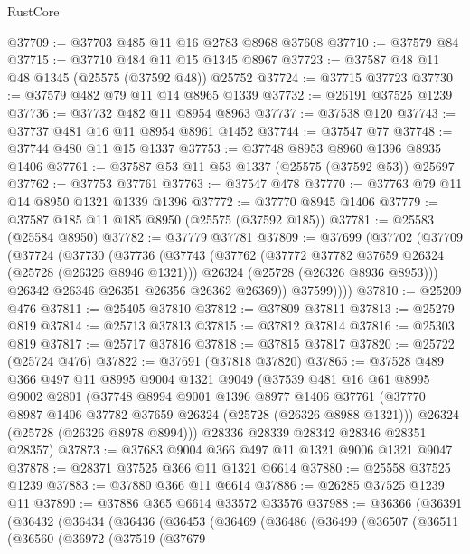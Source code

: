 \begin{lexlean}{RustCore}
\begin{coremodule}
@37709 := @37703 @485 @11 @16 @2783 @8968 @37608
@37710 := @37579 @84
@37715 := @37710 @484 @11 @15 @1345 @8967
@37723 := @37587 @48 @11 @48 @1345 (@25575 (@37592 @48)) @25752
@37724 := @37715 @37723
@37730 := @37579 @482 @79 @11 @14 @8965 @1339
@37732 := @26191 @37525 @1239
@37736 := @37732 @482 @11 @8954 @8963
@37737 := @37538 @120
@37743 := @37737 @481 @16 @11 @8954 @8961 @1452
@37744 := @37547 @77
@37748 := @37744 @480 @11 @15 @1337
@37753 := @37748 @8953 @8960 @1396 @8935 @1406
@37761 := @37587 @53 @11 @53 @1337 (@25575 (@37592 @53)) @25697
@37762 := @37753 @37761
@37763 := @37547 @478
@37770 := @37763 @79 @11 @14 @8950 @1321 @1339 @1396
@37772 := @37770 @8945 @1406
@37779 := @37587 @185 @11 @185 @8950 (@25575 (@37592 @185))
@37781 := @25583 (@25584 @8950)
@37782 := @37779 @37781
@37809 := @37699
    (@37702
      (@37709
        (@37724
          (@37730
            (@37736
              (@37743
                (@37762
                  (@37772 @37782 @37659 @26324 (@25728 (@26326 @8946 @1321)))
                  @26324
                  (@25728 (@26326 @8936 @8953)))
                @26342
                @26346
                @26351
                @26356
                @26362
                @26369))
            @37599))))
@37810 := @25209 @476
@37811 := @25405 @37810
@37812 := @37809 @37811
@37813 := @25279 @819
@37814 := @25713 @37813
@37815 := @37812 @37814
@37816 := @25303 @819
@37817 := @25717 @37816
@37818 := @37815 @37817
@37820 := @25722 (@25724 @476)
@37822 := @37691 (@37818 @37820)
@37865 := @37528
    @489
    @366
    @497
    @11
    @8995
    @9004
    @1321
    @9049
    (@37539
      @481
      @16
      @61
      @8995
      @9002
      @2801
      (@37748
        @8994
        @9001
        @1396
        @8977
        @1406
        @37761
        (@37770 @8987 @1406 @37782 @37659 @26324 (@25728 (@26326 @8988 @1321)))
        @26324
        (@25728 (@26326 @8978 @8994)))
      @28336
      @28339
      @28342
      @28346
      @28351
      @28357)
@37873 := @37683 @9004 @366 @497 @11 @1321 @9006 @1321 @9047
@37878 := @28371 @37525 @366 @11 @1321 @6614
@37880 := @25558 @37525 @1239
@37883 := @37880 @366 @11 @6614
@37886 := @26285 @37525 @1239 @11
@37890 := @37886 @365 @6614 @33572 @33576
@37988 := @36366
    (@36391
      (@36432
        (@36434
          (@36436
            (@36453
              (@36469
                (@36486
                  (@36499
                    (@36507
                      (@36511
                        (@36560
                          (@36972
                            (@37519
                              (@37679

\end{coremodule}
\end{lexlean}
